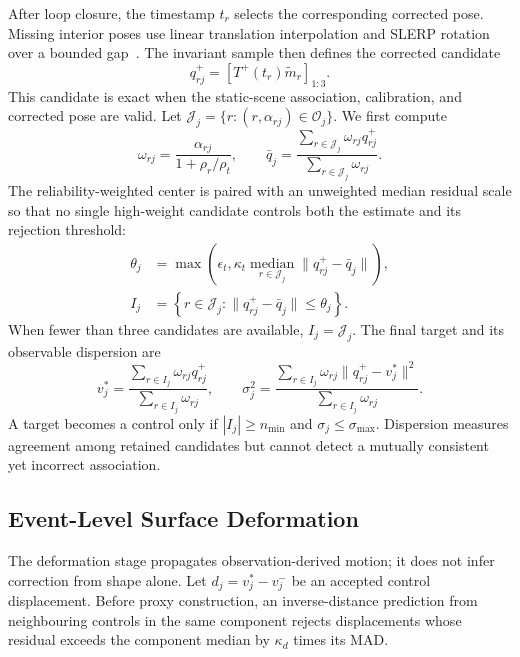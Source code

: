 After loop closure, the timestamp $t_r$ selects the corresponding corrected
pose. Missing interior poses use linear translation interpolation and SLERP
rotation over a bounded gap~\cite{shoemake1985slerp}. The invariant sample then
defines the corrected candidate
\begin{equation}
q_{rj}^+=\left[T^+(t_r)\widetilde m_r\right]_{1:3}.
\label{eq:corrected_target}
\end{equation}
This candidate is exact when the static-scene association, calibration, and
corrected pose are valid. Let
$\mathcal J_j=\{r:(r,\alpha_{rj})\in\mathcal O_j\}$. We first compute
\begin{equation}
\omega_{rj}=\frac{\alpha_{rj}}{1+\rho_r/\rho_t},
\qquad
\bar q_j=
\frac{\sum_{r\in\mathcal J_j}\omega_{rj}q_{rj}^+}
     {\sum_{r\in\mathcal J_j}\omega_{rj}}.
\label{eq:target_initial}
\end{equation}
The reliability-weighted center is paired with an unweighted median residual
scale so that no single high-weight candidate controls both the estimate and
its rejection threshold:
\begin{equation}
\begin{aligned}
\theta_j&=\max\!\left(
\epsilon_t,
\kappa_t\operatorname*{median}_{r\in\mathcal J_j}
\|q_{rj}^+-\bar q_j\|\right),\\
I_j&=\left\{r\in\mathcal J_j:
\|q_{rj}^+-\bar q_j\|\le\theta_j\right\}.
\end{aligned}
\label{eq:target_inliers}
\end{equation}
When fewer than three candidates are available, $I_j=\mathcal J_j$. The final
target and its observable dispersion are
\begin{equation}
v_j^*=
\frac{\sum_{r\in I_j}\omega_{rj}q_{rj}^+}
     {\sum_{r\in I_j}\omega_{rj}},
\qquad
\sigma_j^2=
\frac{\sum_{r\in I_j}\omega_{rj}\|q_{rj}^+-v_j^*\|^2}
     {\sum_{r\in I_j}\omega_{rj}}.
\label{eq:target}
\end{equation}
A target becomes a control only if $|I_j|\ge n_{\min}$ and
$\sigma_j\le\sigma_{\max}$. Dispersion measures agreement among retained
candidates but cannot detect a mutually consistent yet incorrect association.

\subsection{Event-Level Surface Deformation}

The deformation stage propagates observation-derived motion; it does not infer
correction from shape alone. Let $d_j=v_j^*-v_j^-$ be an accepted control
displacement. Before proxy construction, an inverse-distance prediction from
neighbouring controls in the same component rejects displacements whose
residual exceeds the component median by $\kappa_d$ times its MAD.

